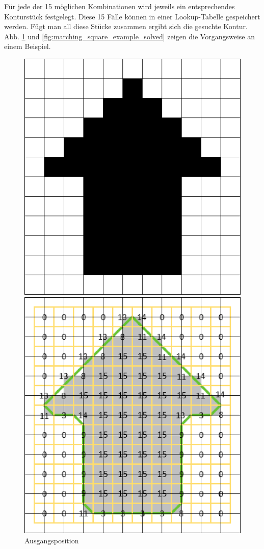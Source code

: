 %
Für jede der 15 möglichen Kombinationen wird jeweils ein entsprechendes Konturstück festgelegt. Diese 15 Fälle können in einer Lookup-Tabelle gespeichert werden. Fügt man all diese Stücke zusammen ergibt sich die gesuchte Kontur. Abb. \ref{fig:marching_square_example} und \ref{fig:marching_square_example_solved} zeigen die Vorgangsweise an einem Beispiel.
\begin{figure}[!htb]
	\includegraphics[width=\linewidth]{img/marching_square_example.png}
	\caption{Ausgangsposition}\label{fig:marching_square_example}
	\endminipage\hfill
	\includegraphics[width=\linewidth]{img/marching_square_example_solved.png}

\end{figure}
